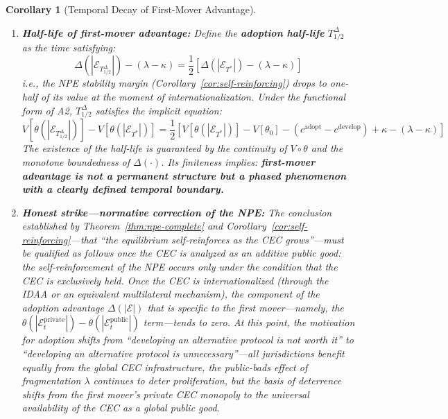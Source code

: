 \documentclass[12pt,a4paper]{article}
\newtheorem{corollary}[theorem]{Corollary}
\theoremstyle{definition}
\theoremstyle{remark}
\begin{document}
\begin{corollary}[Temporal Decay of First-Mover Advantage]
\begin{enumerate}[label=(\roman*), itemsep=6pt]
\item \textbf{Half-life of first-mover advantage:} Define the \textbf{adoption half-life} $T_{1/2}^{\Delta}$ as the time satisfying:
\begin{equation}
\Delta(|\mathcal{E}_{T_{1/2}^{\Delta}}|) - (\lambda - \kappa) = \frac{1}{2}\left[\Delta(|\mathcal{E}_{T^*}|) - (\lambda - \kappa)\right]
\end{equation}
i.e., the NPE stability margin (Corollary~\ref{cor:self-reinforcing}) drops to one-half of its value at the moment of internationalization. Under the functional form of A2, $T_{1/2}^{\Delta}$ satisfies the implicit equation:
\begin{equation}
V[\theta(|\mathcal{E}_{T_{1/2}^{\Delta}}|)] - V[\theta(|\mathcal{E}_{T^*}|)] = \frac{1}{2}\left[V[\theta(|\mathcal{E}_{T^*}|)] - V[\theta_0] - (c^{\text{adopt}} - c^{\text{develop}}) + \kappa - (\lambda - \kappa)\right]
\end{equation}
The existence of the half-life is guaranteed by the continuity of $V \circ \theta$ and the monotone boundedness of $\Delta(\cdot)$. Its finiteness implies: \textbf{first-mover advantage is not a permanent structure but a phased phenomenon with a clearly defined temporal boundary.}

\item \textbf{Honest strike—normative correction of the NPE:} The conclusion established by Theorem~\ref{thm:npe-complete} and Corollary~\ref{cor:self-reinforcing}—that ``the equilibrium self-reinforces as the CEC grows''—must be qualified as follows once the CEC is analyzed as an additive public good: the self-reinforcement of the NPE occurs only under the condition that the CEC is \textit{exclusively held}. Once the CEC is internationalized (through the IDAA or an equivalent multilateral mechanism), the component of the adoption advantage $\Delta(|\mathcal{E}|)$ that is specific to the first mover—namely, the $\theta(|\mathcal{E}_t^{\text{private}}|) - \theta(|\mathcal{E}_t^{\text{public}}|)$ term—tends to zero. At this point, the motivation for adoption shifts from ``developing an alternative protocol is not worth it'' to ``developing an alternative protocol is unnecessary''—all jurisdictions benefit equally from the global CEC infrastructure, the public-bads effect of fragmentation $\lambda$ continues to deter proliferation, but the basis of deterrence shifts from the first mover's private CEC monopoly to the universal availability of the CEC as a global public good.


\end{enumerate}
\end{corollary}
\end{document}
